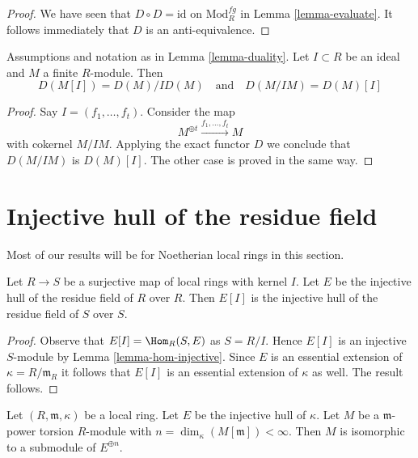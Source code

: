 \begin{proof}
We have seen that $D \circ D = \text{id}$ on $\text{Mod}^{fg}_R$
in Lemma \ref{lemma-evaluate}. It follows immediately that
$D$ is an anti-equivalence.
\end{proof}

\begin{lemma}
\label{lemma-duality-torsion-cotorsion}
Assumptions and notation as in Lemma \ref{lemma-duality}.
Let $I \subset R$ be an ideal and $M$ a finite $R$-module.
Then
$$
D(M[I]) = D(M)/ID(M) \quad\text{and}\quad D(M/IM) = D(M)[I]
$$
\end{lemma}

\begin{proof}
Say $I = (f_1, \ldots, f_t)$. Consider the map
$$
M^{\oplus t} \xrightarrow{f_1, \ldots, f_t} M
$$
with cokernel $M/IM$. Applying the exact functor $D$ we conclude that
$D(M/IM)$ is $D(M)[I]$. The other case is proved in the same way.
\end{proof}



\section{Injective hull of the residue field}
\label{section-hull-residue-field}

\noindent
Most of our results will be for Noetherian local rings in this section.

\begin{lemma}
\label{lemma-quotient}
Let $R \to S$ be a surjective map of local rings with kernel $I$.
Let $E$ be the injective hull of the residue field of $R$ over $R$.
Then $E[I]$ is the injective hull of the residue field of $S$ over $S$.
\end{lemma}

\begin{proof}
Observe that $E[I] = \Hom_R(S, E)$ as $S = R/I$. Hence $E[I]$ is an injective
$S$-module by Lemma \ref{lemma-hom-injective}. Since $E$ is an essential
extension of $\kappa = R/\mathfrak m_R$ it follows that $E[I]$ is an
essential extension of $\kappa$ as well. The result follows.
\end{proof}

\begin{lemma}
\label{lemma-torsion-submodule-sum-injective-hulls}
Let $(R, \mathfrak m, \kappa)$ be a local ring.
Let $E$ be the injective hull of $\kappa$.
Let $M$ be a $\mathfrak m$-power torsion $R$-module
with $n = \dim_\kappa(M[\mathfrak m]) < \infty$.
Then $M$ is isomorphic to a submodule of $E^{\oplus n}$.
\end{lemma}

